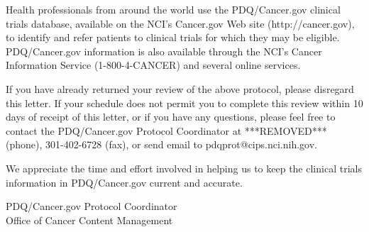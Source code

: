 \documentclass[letterpaper,12pt]{letter}
\begin{document}
Health professionals from around the world use the PDQ/Cancer.gov clinical
trials database, available on the NCI's Cancer.gov Web site
(http://cancer.gov), to identify and refer patients to clinical trials for
which they may be eligible.  PDQ/Cancer.gov information is
also available through the NCI's Cancer Information Service (1-800-4-CANCER)
and several online services.

If you have already returned your review of the above protocol, please
disregard this letter.  If your schedule does not permit you to complete this
review within 10 days of receipt of this letter, or if you have any questions,
please feel free to contact the PDQ/Cancer.gov Protocol
Coordinator at ***REMOVED*** (phone), 301-402-6728 (fax), or send email to 
pdqprot@cips.nci.nih.gov.

We appreciate the time and effort involved in helping us to keep the clinical
trials information in PDQ/Cancer.gov current and accurate.

\vspace{12pt}

PDQ/Cancer.gov Protocol Coordinator \\
Office of Cancer Content Management

\vfill
\end{document}
